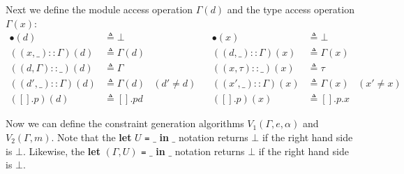 \documentclass{article}
\theoremstyle{definition}
\newcommand*{\cons}{::}
\newcommand*{\modid}{d}
\begin{document}
Next we define the module access operation $\Gamma(\modid)$ and the type access operation $\Gamma(x)$:
\begin{align*}
  \bullet(\modid)                   & \triangleq\bot           &            &  & \bullet(x)                  & \triangleq\bot                   \\
  ((x,\_)\cons\Gamma)(\modid)       & \triangleq\Gamma(\modid) &            &  & ((\modid,\_)\cons\Gamma)(x) & \triangleq\Gamma(x)              \\
  ((\modid,\Gamma)\cons\_)(\modid)  & \triangleq\Gamma         &            &  & ((x,\tau)\cons\_)(x)        & \triangleq\tau                   \\
  ((\modid',\_)\cons\Gamma)(\modid) & \triangleq\Gamma(\modid) & (d'\neq d) &  & ((x',\_)\cons\Gamma)(x)     & \triangleq\Gamma(x) & (x'\neq x) \\
  ([].p)(\modid)                    & \triangleq[].pd          &            &  & ([].p)(x)                   & \triangleq[].p.x
\end{align*}

Now we can define the constraint generation algorithms $V_1(\Gamma,e,\alpha)$ and $V_2(\Gamma,m)$.
Note that the \textbf{let} $U$ \texttt{=} $\_$ \textbf{in} $\_$ notation returns $\bot$ if the right hand side is $\bot$.
Likewise, the \textbf{let} $(\Gamma,U)$ \texttt{=} $\_$ \textbf{in} $\_$ notation returns $\bot$ if the right hand side is $\bot$.
\end{document}
